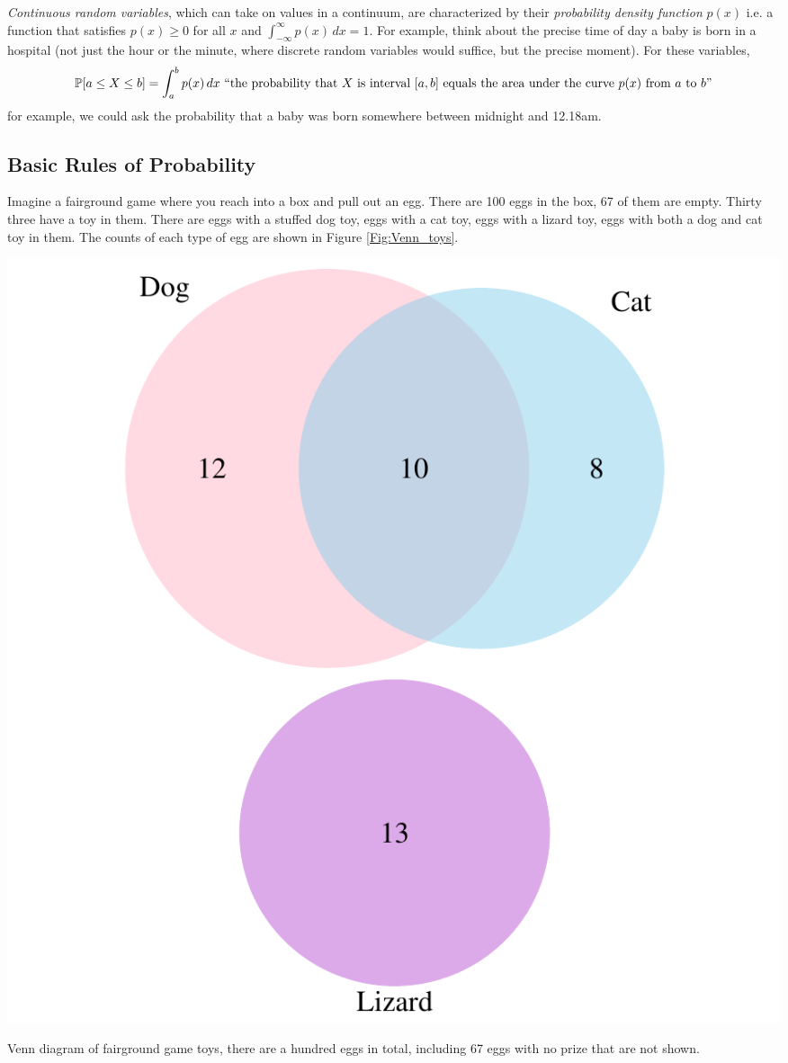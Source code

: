  \emph{Continuous random variables},  which can take on values in a continuum, are
 characterized by their  \emph{probability density function} $p(x)$
 i.e. a function that satisfies $p(x)\ge 0$ for all $x$ and
 $\int_{-\infty}^\infty p(x)\,dx =1$. For example, think about the
 precise time of day a baby
is born in a hospital (not just the hour or the minute, where discrete
random variables would suffice, but the
precise moment). For these variables, 
\[
\P[a\le X\le b] = \int_a^b p(x)\,dx \mbox{ ``the probability that $X$ is interval $[a,b]$ equals the area under the curve $p(x)$ from $a$ to $b$''}
\]
for example, we could ask the probability that a baby was born
somewhere between
midnight and 12.18am. 

\subsection{Basic Rules of Probability} \label{Section_rules_prob}
Imagine a fairground game where you reach into a box and pull out an
egg. There are 100 eggs in the box, 67 of them are empty. Thirty three have a toy in them.
There are eggs with a stuffed dog toy, eggs with a cat toy, eggs with
a lizard toy, eggs with both a dog and cat toy in them. The counts of
each type of egg are shown in Figure \ref{Fig:Venn_toys}.


 \begin{marginfigure}
 \begin{center}
   \includegraphics[width=\textwidth]{math_background/dist_pics/Venn_toys.pdf}\end{center}
 \caption{Venn diagram of fairground game toys, there are a hundred
   eggs in total, including 67 eggs with no prize that are not shown. }\label{Fig:Venn_toys}
 \end{marginfigure}

